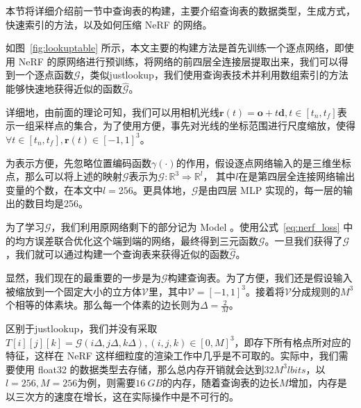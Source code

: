 本节将详细介绍前一节中查询表的构建，主要介绍查询表的数据类型，生成方式，快速索引的方法，以及如何压缩 NeRF 的网络。

如图~\ref{fig:lookuptable} 所示，本文主要的构建方法是首先训练一个逐点网络，即使用 NeRF 的原网络进行预训练，将网络的前四层全连接层提取出来，我们可以得到一个逐点函数$\mathcal{G}$，类似justlookup\cite{lin2019justlookup}，我们使用查询表技术并利用数组索引的方法能够快速地获得近似的函数$\hat{\mathcal{G}}$。

详细地，由前面的理论可知，我们可以用相机光线$\symbf{r}\left(t\right) = \symbf{o} + t \symbf{d}, t \in \left[t_n, t_f\right]$表示一组采样点的集合，为了使用方便，事先对光线的坐标范围进行尺度缩放，使得
$\forall t \in  \left[t_n, t_f\right], \symbf{r}\left(t\right) \in \left[-1, 1\right]^3$。

为表示方便，先忽略位置编码函数$\gamma\left(\cdot\right)$的作用，假设逐点网络输入的是三维坐标点，那么可以将上述的映射$\mathcal{G}$表示为$\mathcal{G}: \mathbb{R}^3 \Rightarrow \mathbb{R}^l$， 其中$l$在是第四层全连接网络输出变量的个数，在本文中$l = 256$。更具体地，$\mathcal{G}$是由四层 MLP 实现的，每一层的输出的数目均是256。

为了学习$\mathcal{G}$，我们利用原网络剩下的部分记为 Model 。使用公式~\ref{eq:nerf_loss} 中的均方误差联合优化这个端到端的网络，最终得到三元函数$\mathcal{G}$。一旦我们获得了$\mathcal{G}$，我们就可以通过构建一个查询表来获得近似的函数$\hat{\mathcal{G}}$。

显然，我们现在的最重要的一步是为$\mathcal{G}$构建查询表。为了方便，我们还是假设输入被缩放到一个固定大小的立方体$\mathcal{V}$里，其中$\mathcal{V} = \left[-1, 1\right]^3$。接着将$\mathcal{V}$分成规则的$M^3$个相等的体素块。那么每一个体素的边长则为$\Delta = \frac{2}{M}$。

区别于justlookup\cite{lin2019justlookup}，我们并没有采取$T\left[i\right]\left[j\right]\left[k\right] = \mathcal{G}\left(i\Delta, j\Delta, k\Delta\right), \left(i, j, k\right) \in \left[0, M\right]^3$，即存下所有格点所对应的特征，这样在 NeRF 这样细粒度的渲染工作中几乎是不可取的。实际中，我们需要使用 float32 的数据类型去存储，那么总内存开销就会达到$32M^{3}l bits$，以$l = 256, M = 256$为例，则需要$\SI{16}{GB}$的内存，随着查询表的边长$M$增加，内存是以三次方的速度在增长，这在实际操作中是不可行的。

